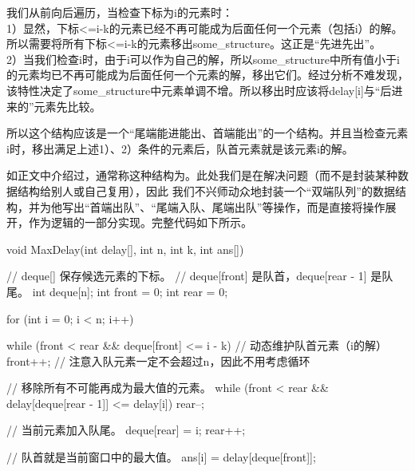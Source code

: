     我们从前向后遍历，当检查下标为i的元素时：\\
    1）显然，下标<=i-k的元素已经不再可能成为后面任何一个元素（包括i）的解。所以需要将所有下标<=i-k的元素移出some\_structure。这正是“先进先出”。\\
    2）当我们检查i时，由于i可以作为自己的解，所以some\_structure中所有值小于i的元素均已不再可能成为后面任何一个元素的解，移出它们。经过分析不难发现，
    该特性决定了some\_structure中元素单调不增。所以移出时应该将delay[i]与“后进来的”元素先比较。

    所以这个结构应该是一个“尾端能进能出、首端能出”的一个结构。并且当检查元素i时，移出满足上述1）、2）条件的元素后，队首元素就是该元素i的解。

    如正文中介绍过，通常称这种结构为。此处我们是在解决问题（而不是封装某种数据结构给别人或自己复用），因此
    我们不兴师动众地封装一个“双端队列”的数据结构，并为他写出“首端出队”、“尾端入队、尾端出队”等操作，而是直接将操作展开，作为逻辑的一部分实现。完整代码如下所示。
    \begin{cppcode}
        void MaxDelay(int delay[], int n, int k, int ans[]) {
            // deque[] 保存候选元素的下标。
            // deque[front] 是队首，deque[rear - 1] 是队尾。
            int deque[n];
            int front = 0;
            int rear = 0;

            for (int i = 0; i < n; i++) {
                while (front < rear && deque[front] <= i - k) {
                    // 动态维护队首元素（i的解）
                    front++;     // 注意入队元素一定不会超过n，因此不用考虑循环
                }

                // 移除所有不可能再成为最大值的元素。
                while (front < rear &&
                    delay[deque[rear - 1]] <= delay[i]) {
                    rear--;
                }

                // 当前元素加入队尾。
                deque[rear] = i;
                rear++;

                // 队首就是当前窗口中的最大值。
                ans[i] = delay[deque[front]];
            }
        }
    \end{cppcode}


